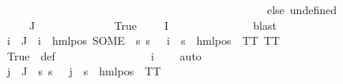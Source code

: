 \begin{isabellebody}
\ \ \ \ \ \ \ \ \ \ \ \ \ \ \ \ \ \ \ \ \ \ \ \ \ \ \ \ \ \ \ \ \ \ \ \ \ \ \ \ \ \ \ \ \ \ \ \ else\ undefined{\isacharparenright}{\kern0pt}{\isacharparenright}{\kern0pt}{\isacharparenright}{\kern0pt}{\isachardoublequoteclose}\isanewline
\ \ \ \ \ \ \ \ \ \ \isamarkupfalse%
\ {\isachardoublequoteopen}{\isasymphi}\ {\isasymnotin}\ {\isasymPhi}\ {\isacharbackquote}{\kern0pt}\ J{\isachardoublequoteclose}\isanewline
\ \ \ \ \ \ \ \ \ \ \ \ \isamarkupfalse%
\ True\ {\isacartoucheopen}{\isasymphi}\ {\isasymin}\ {\isasymPhi}\ {\isacharbackquote}{\kern0pt}\ I{\isacartoucheclose}\ \isanewline
\ \ \ \ \ \ \ \ \ \ \ \ \isamarkupfalse%
\ blast\isanewline
\ \ \ \ \ \ \ \ \ \ \isamarkupfalse%
\ {\isachardoublequoteopen}{\isasymforall}i\ {\isasymin}\ J{\isachardot}{\kern0pt}\ {\isasymPsi}\ i\ {\isacharequal}{\kern0pt}\ {\isacharparenleft}{\kern0pt}hml{\isacharunderscore}{\kern0pt}pos\ {\isacharparenleft}{\kern0pt}SOME\ {\isasymalpha}{\isachardot}{\kern0pt}\ {\isacharparenleft}{\kern0pt}{\isasymforall}s{\isachardot}{\kern0pt}\ {\isacharparenleft}{\kern0pt}s\ {\isasymTurnstile}\ {\isasymPhi}\ i{\isacharparenright}{\kern0pt}\ {\isasymlongleftrightarrow}\ {\isacharparenleft}{\kern0pt}s\ {\isasymTurnstile}\ {\isacharparenleft}{\kern0pt}hml{\isacharunderscore}{\kern0pt}pos\ {\isasymalpha}\ TT{\isacharparenright}{\kern0pt}{\isacharparenright}{\kern0pt}{\isacharparenright}{\kern0pt}{\isacharparenright}{\kern0pt}\ TT{\isacharparenright}{\kern0pt}{\isachardoublequoteclose}\isanewline
\ \ \ \ \ \ \ \ \ \ \ \ \isamarkupfalse%
\ True\ {\isachardoublequoteopen}{}{\isachardoublequoteclose}\ {\isasymPsi}{\isacharunderscore}{\kern0pt}def\ \ \isanewline
\ \ \ \ \ \ \ \ \ \ \ \ \isamarkupfalse%
\ {\isacartoucheopen}{\isasymPhi}\ i{\isacharunderscore}{\kern0pt}{\isasymphi}\ {\isacharequal}{\kern0pt}\ {\isasymphi}{\isacartoucheclose}\ \isamarkupfalse%
\ auto\isanewline
\ \ \ \ \ \ \ \ \ \ \isamarkupfalse%
\ {\isachardoublequoteopen}{\isasymforall}j\ {\isasymin}\ J{\isachardot}{\kern0pt}\ {\isasymexists}{\isasymalpha}{\isachardot}{\kern0pt}\ {\isacharparenleft}{\kern0pt}{\isasymforall}s{\isachardot}{\kern0pt}\ {\isacharparenleft}{\kern0pt}s\ {\isasymTurnstile}\ {\isasymPhi}\ j{\isacharparenright}{\kern0pt}\ {\isasymlongleftrightarrow}\ {\isacharparenleft}{\kern0pt}s\ {\isasymTurnstile}\ {\isacharparenleft}{\kern0pt}hml{\isacharunderscore}{\kern0pt}pos\ {\isasymalpha}\ TT{\isacharparenright}{\kern0pt}{\isacharparenright}{\kern0pt}{\isacharparenright}{\kern0pt}{\isachardoublequoteclose}\isanewline

\end{isabellebody}

